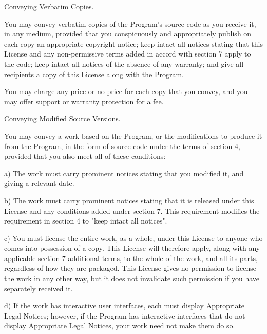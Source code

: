 \begin{DoxyEnumerate}
\item Conveying Verbatim Copies.
\end{DoxyEnumerate}

You may convey verbatim copies of the Program's source code as you receive it, in any medium, provided that you conspicuously and appropriately publish on each copy an appropriate copyright notice; keep intact all notices stating that this License and any non-\/permissive terms added in accord with section 7 apply to the code; keep intact all notices of the absence of any warranty; and give all recipients a copy of this License along with the Program.

You may charge any price or no price for each copy that you convey, and you may offer support or warranty protection for a fee.


\begin{DoxyEnumerate}
\item Conveying Modified Source Versions.
\end{DoxyEnumerate}

You may convey a work based on the Program, or the modifications to produce it from the Program, in the form of source code under the terms of section 4, provided that you also meet all of these conditions\-: \begin{DoxyVerb}a) The work must carry prominent notices stating that you modified
it, and giving a relevant date.

b) The work must carry prominent notices stating that it is
released under this License and any conditions added under section
7.  This requirement modifies the requirement in section 4 to
"keep intact all notices".

c) You must license the entire work, as a whole, under this
License to anyone who comes into possession of a copy.  This
License will therefore apply, along with any applicable section 7
additional terms, to the whole of the work, and all its parts,
regardless of how they are packaged.  This License gives no
permission to license the work in any other way, but it does not
invalidate such permission if you have separately received it.

d) If the work has interactive user interfaces, each must display
Appropriate Legal Notices; however, if the Program has interactive
interfaces that do not display Appropriate Legal Notices, your
work need not make them do so.
\end{DoxyVerb}


